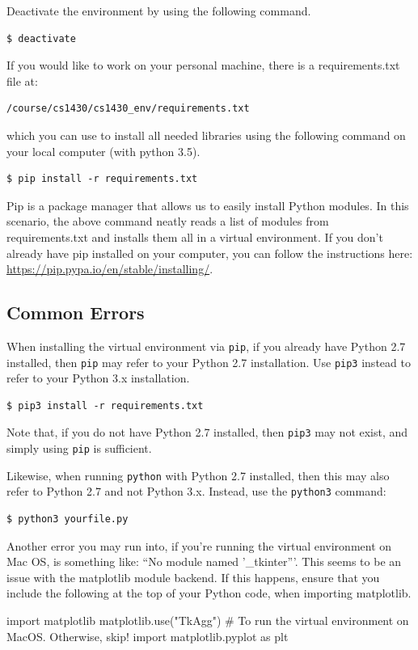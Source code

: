 \documentclass{article}
\begin{document}
Deactivate the environment by using the following command. 
\begin{verbatim}
$ deactivate
\end{verbatim}

If you would like to work on your personal machine, there is a requirements.txt file at: 
\begin{verbatim}
/course/cs1430/cs1430_env/requirements.txt
\end{verbatim} 
which you can use to install all needed libraries using the following command on your local computer (with python 3.5). 
\begin{verbatim}
$ pip install -r requirements.txt
\end{verbatim}

Pip is a package manager that allows us to easily install Python modules. In this scenario, the above command neatly reads a list of modules from requirements.txt and installs them all in a virtual environment. If you don't already have pip installed on your computer, you can follow the instructions here: \href{https://pip.pypa.io/en/stable/installing/}{https://pip.pypa.io/en/stable/installing/}.

\subsection{Common Errors}
When installing the virtual environment via \texttt{pip}, if you already have Python 2.7 installed, then \texttt{pip} may refer to your Python 2.7 installation. Use \texttt{pip3} instead to refer to your Python 3.x installation.
\begin{verbatim}
$ pip3 install -r requirements.txt
\end{verbatim}
Note that, if you do not have Python 2.7 installed, then \texttt{pip3} may not exist, and simply using \texttt{pip} is sufficient.

Likewise, when running \texttt{python} with Python 2.7 installed, then this may also refer to Python 2.7 and not Python 3.x. Instead, use the \texttt{python3} command:
\begin{verbatim}
$ python3 yourfile.py
\end{verbatim}

Another error you may run into, if you're running the virtual environment on Mac OS, is something like: ``No module named '\_tkinter'''. This seems to be an issue with the matplotlib module backend. If this happens, ensure that you include the following at the top of your Python code, when importing matplotlib. 
\begin{python}
import matplotlib
matplotlib.use("TkAgg") # To run the virtual environment on MacOS. Otherwise, skip!
import matplotlib.pyplot as plt
\end{python}
\end{document}
